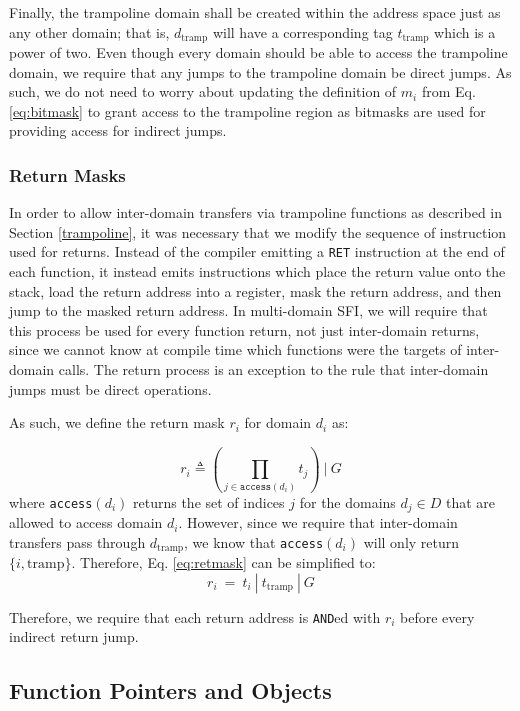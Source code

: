 \documentclass[12pt]{article}
\begin{document}
Finally, the trampoline domain shall be created within the address space just as any other domain; that is, $d_\text{tramp}$ will have a corresponding tag $t_\text{tramp}$ which is a power of two. Even though every domain should be able to access the trampoline domain, we require that any jumps to the trampoline domain be direct jumps. As such, we do not need to worry about updating the definition of $m_i$ from Eq. \ref{eq:bitmask} to grant access to the trampoline region as bitmasks are used for providing access for indirect jumps.


\subsubsection{Return Masks} \label{retmasks}

In order to allow inter-domain transfers via trampoline functions as described in Section \ref{trampoline}, it was necessary that we modify the sequence of instruction used for returns. Instead of the compiler emitting a \texttt{RET} instruction at the end of each function, it instead emits instructions which place the return value onto the stack, load the return address into a register, mask the return address, and then jump to the masked return address. In multi-domain SFI, we will require that this process be used for every function return, not just inter-domain returns, since we cannot know at compile time which functions were the targets of inter-domain calls. The return process is an exception to the rule that inter-domain jumps must be direct operations.

As such, we define the return mask $r_i$ for domain $d_i$ as:

\begin{equation} \label{eq:retmask}
r_i \triangleq (\prod_{j\in\texttt{access}(d_i)}t_j)\ |\ G
\end{equation}
where \texttt{access}$(d_i)$ returns the set of indices $j$ for the domains $d_j\in D$ that are allowed to access domain $d_i$. However, since we require that inter-domain transfers pass through $d_\text{tramp}$, we know that \texttt{access}$(d_i)$ will only return $\{i,\text{tramp}\}$. Therefore, Eq. \ref{eq:retmask} can be simplified to:
$$ r_i\ =\ t_i\ |\ t_\text{tramp}\ |\ G $$

Therefore, we require that each return address is \texttt{AND}ed with $r_i$ before every indirect return jump.

\subsection{Function Pointers and Objects}
\end{document}
